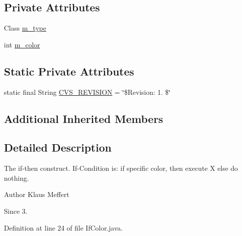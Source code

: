\subsection*{Private Attributes}
\begin{DoxyCompactItemize}
\item 
Class \hyperlink{classexamples_1_1gp_1_1tictactoe_1_1_if_color_a6b0c3ee2e79718064192de87890f032e}{m\-\_\-type}
\item 
int \hyperlink{classexamples_1_1gp_1_1tictactoe_1_1_if_color_a11968a779c0e382106d9b7f18574e641}{m\-\_\-color}
\end{DoxyCompactItemize}
\subsection*{Static Private Attributes}
\begin{DoxyCompactItemize}
\item 
static final String \hyperlink{classexamples_1_1gp_1_1tictactoe_1_1_if_color_ae53f3106ae8372264cf58e51555daaec}{C\-V\-S\-\_\-\-R\-E\-V\-I\-S\-I\-O\-N} = \char`\"{}\$Revision\-: 1. \$\char`\"{}
\end{DoxyCompactItemize}
\subsection*{Additional Inherited Members}


\subsection{Detailed Description}
The if-\/then construct. If-\/\-Condition is\-: if specific color, then execute X else do nothing.

\begin{DoxyAuthor}{Author}
Klaus Meffert 
\end{DoxyAuthor}
\begin{DoxySince}{Since}
3. 
\end{DoxySince}


Definition at line 24 of file If\-Color.\-java.



